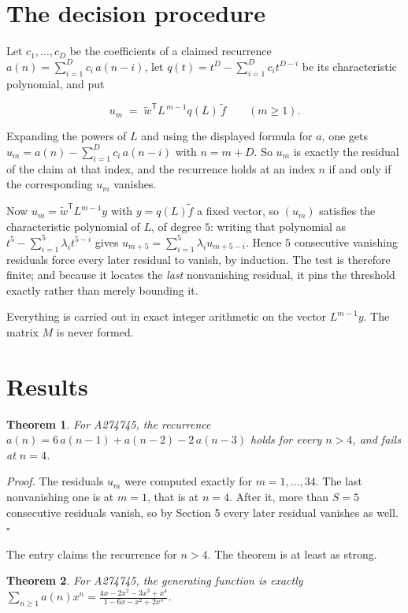 \documentclass[11pt]{article}
\newtheorem{theorem}{Theorem}
\theoremstyle{definition}
\begin{document}
\section{The decision procedure}

Let $c_1,\dots,c_D$ be the coefficients of a claimed recurrence $a(n) = \sum_{i=1}^{D} c_i\,a(n-i)$, let $q(t) = t^{D} - \sum_{i=1}^{D} c_i t^{D-i}$ be its characteristic polynomial, and put

\[u_m \;=\; \tilde w^{\mathsf T} L^{\,m-1} q(L)\,\tilde f \qquad (m \ge 1).\]

Expanding the powers of $L$ and using the displayed formula for $a$, one gets $u_m = a(n) - \sum_{i=1}^{D} c_i\,a(n-i)$ with $n = m + D$. So $u_m$ is exactly the residual of the claim at that index, and the recurrence holds at an index $n$ if and only if the corresponding $u_m$ vanishes.

Now $u_m = \tilde w^{\mathsf T} L^{m-1} y$ with $y = q(L)\tilde f$ a fixed vector, so $(u_m)$ satisfies the characteristic polynomial of $L$, of degree $5$: writing that polynomial as $t^{5} - \sum_{i=1}^{5} \lambda_i t^{5-i}$ gives $u_{m+5} = \sum_{i=1}^{5} \lambda_i u_{m+5-i}$. Hence $5$ consecutive vanishing residuals force every later residual to vanish, by induction. The test is therefore finite; and because it locates the {\itshape last} nonvanishing residual, it pins the threshold exactly rather than merely bounding it.

Everything is carried out in exact integer arithmetic on the vector $L^{m-1}y$. The matrix $M$ is never formed.

\section{Results}

\begin{theorem} For A274745, the recurrence $a(n) = 6\,a(n-1) + a(n-2) - 2\,a(n-3)$ holds for every $n > 4$, and fails at $n = 4$.\end{theorem}

{\itshape Proof.} The residuals $u_m$ were computed exactly for $m = 1,\dots,34$. The last nonvanishing one is at $m = 1$, that is at $n = 4$. After it, more than $S = 5$ consecutive residuals vanish, so by Section 5 every later residual vanishes as well. $\square$

The entry claims the recurrence for $n > 4$. The theorem is at least as strong.

\begin{theorem} For A274745, the generating function is exactly $\sum_{n\ge 1} a(n)x^n = \frac{4x - 2x^{2} - 3x^{3} + x^{4}}{1 - 6x - x^{2} + 2x^{3}}$.\end{theorem}
\end{document}
